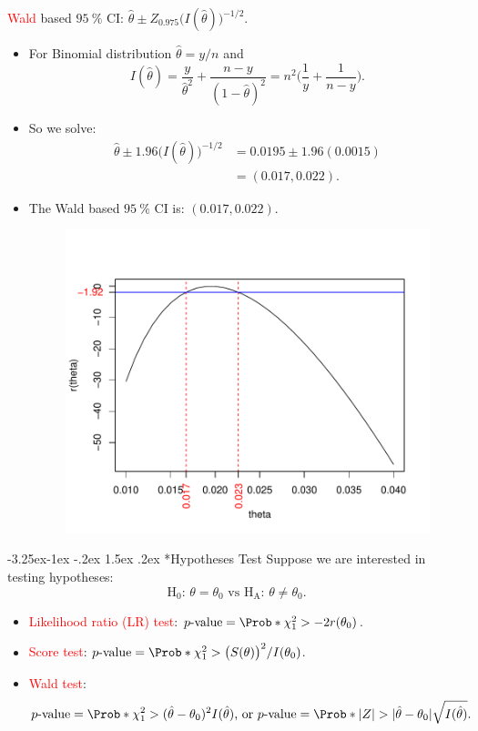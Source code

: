 \documentclass[final]{article}\usepackage[]{graphicx}\usepackage[svgnames]{xcolor}
\makeatletter
\renewcommand\subsection{\@startsection{subsection}{2}{\z@}%
                                     {-3.25ex\@plus -1ex \@minus -.2ex}%
                                     {1.5ex \@plus .2ex}%
                                     {\normalfont\large\bfseries\scshape\color{Blue}}}
\newcommand{\HN}{\text{H}_0}%
\newcommand{\HA}{\text{H}_{\text{A}}}%
\DeclarePairedDelimiter\abs{\lvert}{\rvert}
\makeatother
\begin{document}
\textcolor{Red}{Wald} based $ \qty{95}{\percent} $ CI: $ \hat{\theta}\pm Z_{0.975}\bigl(I(\hat{\theta})\bigr)^{-1/2} $.
\begin{itemize}
      \item For Binomial distribution $ \hat{\theta}=y/n $ and
            \[ I(\hat{\theta})=\frac{y}{\hat{\theta}^2}+\frac{n-y}{(1-\hat{\theta})^2}=n^2\biggl(\frac{1}{y} +\frac{1}{n-y}\biggr).   \]
      \item So we solve:
            \begin{align*}
                  \hat{\theta}\pm 1.96\bigl(I(\hat{\theta})\bigr)^{-1/2}
                   & =0.0195 \pm 1.96(0.0015) \\
                   & =(0.017, 0.022).
            \end{align*}
      \item The Wald based $ \qty{95}{\percent} $ CI is: $ (0.017, 0.022) $.
            \begin{figure}[!htbp]
                  \centering
                  \includegraphics{figures/1bLR.pdf}
            \end{figure}
\end{itemize}
\subsection*{Hypotheses Test}
Suppose we are interested in testing hypotheses:
\[ \text{$\HN$: $\theta=\theta_0$ vs $\HA$: $\theta\ne \theta_0$.} \]
\begin{itemize}
      \item \textcolor{Red}{Likelihood ratio (LR) test}: $ p\text{-value}=\Prob*{\chi^2_1>-2r(\theta_0)} $.
      \item \textcolor{Red}{Score test}: $ p\text{-value}=\Prob*{\chi^2_1>\bigl(S(\theta)\bigr)^2/I(\theta_0)} $.
      \item \textcolor{Red}{Wald test}:
            \[ p\text{-value}=\Prob*{\chi^2_1>(\hat{\theta}-\theta_0)^2 I(\hat{\theta})}\text{, or }
                  p\text{-value}=\Prob*{\abs{Z}>\abs{\hat{\theta}-\theta_0}\sqrt{I(\hat{\theta})}}. \]
\end{itemize}
\end{document}
